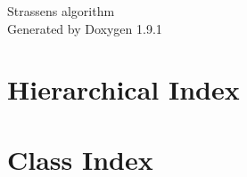 \let\mypdfximage\pdfximage\def\pdfximage{\immediate\mypdfximage}\documentclass[twoside]{book}
\newcommand{\+}{\discretionary{\mbox{\scriptsize$\hookleftarrow$}}{}{}}
\newcommand{\clearemptydoublepage}{%
  \newpage{\pagestyle{empty}\cleardoublepage}%
}
\begin{document}
\raggedbottom

\hypersetup{pageanchor=false,
             bookmarksnumbered=true,
             pdfencoding=unicode
            }
\begin{titlepage}
\vspace*{7cm}
\begin{center}%
{\Large Strassen\textquotesingle{}s algorithm }\\
\vspace*{1cm}
{\large Generated by Doxygen 1.9.1}\\
\end{center}
\end{titlepage}
\clearemptydoublepage
{}
\tableofcontents
\clearemptydoublepage
{}
\hypersetup{pageanchor=true}

\chapter{Hierarchical Index}

\chapter{Class Index}

\end{document}
